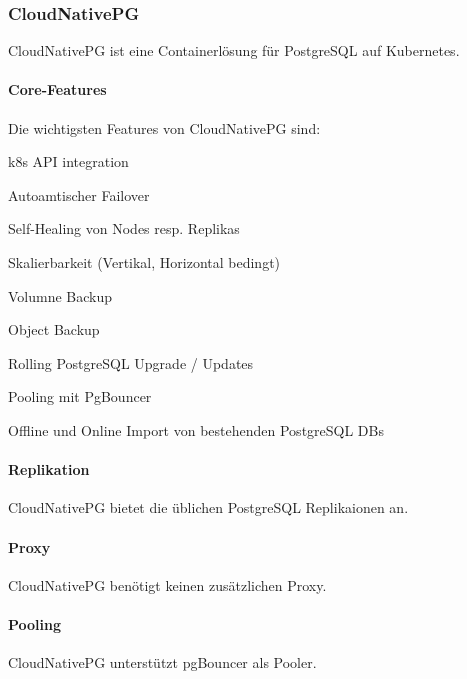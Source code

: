 
\begin{flushleft}
    \subsubsection{CloudNativePG}
    CloudNativePG ist eine Containerlösung für PostgreSQL auf Kubernetes.
\end{flushleft}
\begin{flushleft}
    \paragraph{Core-Features}
    Die wichtigsten Features von CloudNativePG sind\cite{5ALQPE2U}:
    \begin{description}
        \item k8s API integration
        \item Autoamtischer Failover
        \item Self-Healing von Nodes resp. Replikas
        \item Skalierbarkeit (Vertikal, Horizontal bedingt)
        \item Volumne Backup
        \item Object Backup
        \item Rolling PostgreSQL Upgrade / Updates
        \item Pooling mit PgBouncer
        \item Offline und Online Import von bestehenden PostgreSQL DBs
    \end{description}
\end{flushleft}
\begin{flushleft}
    \paragraph{Replikation}
    CloudNativePG bietet die üblichen PostgreSQL Replikaionen an.
\end{flushleft}
\begin{flushleft}
    \paragraph{Proxy}
    CloudNativePG benötigt keinen zusätzlichen Proxy.
\end{flushleft}
\begin{flushleft}
    \paragraph{Pooling}
    CloudNativePG unterstützt pgBouncer als Pooler.
\end{flushleft}
